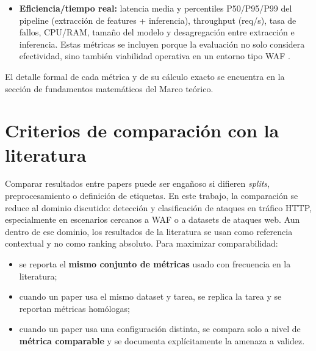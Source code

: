 \documentclass[12pt,oneside]{report}
\begin{document}
\begin{itemize}[leftmargin=*]
  \item \textbf{Eficiencia/tiempo real:} latencia media y percentiles P50/P95/P99 del pipeline (extracción de features + inferencia), throughput (req/s), tasa de fallos, CPU/RAM, tamaño del modelo y desagregación entre extracción e inferencia. Estas métricas se incluyen porque la evaluación no solo considera efectividad, sino también viabilidad operativa en un entorno tipo WAF \cite{ocswaf_zenodo}.
\end{itemize}

El detalle formal de cada métrica y de su cálculo exacto se encuentra en la sección de fundamentos matemáticos del Marco teórico.

\section{Criterios de comparación con la literatura}
Comparar resultados entre papers puede ser engañoso si difieren \textit{splits}, preprocesamiento o definición de etiquetas. En este trabajo, la comparación se reduce al dominio discutido: detección y clasificación de ataques en tráfico HTTP, especialmente en escenarios cercanos a WAF o a datasets de ataques web. Aun dentro de ese dominio, los resultados de la literatura se usan como referencia contextual y no como ranking absoluto. Para maximizar comparabilidad:
\begin{itemize}[leftmargin=*]
  \item se reporta el \textbf{mismo conjunto de métricas} usado con frecuencia en la literatura;
  \item cuando un paper usa el mismo dataset y tarea, se replica la tarea y se reportan métricas homólogas;
  \item cuando un paper usa una configuración distinta, se compara solo a nivel de \textbf{métrica comparable} y se documenta explícitamente la amenaza a validez.
\end{itemize}
\end{document}
